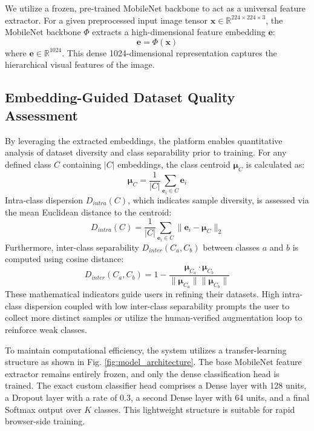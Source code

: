 \documentclass[conference]{IEEEtran}
\begin{document}
We utilize a frozen, pre-trained MobileNet backbone to act as a universal feature extractor. For a given preprocessed input image tensor $\mathbf{x} \in \mathbb{R}^{224 \times 224 \times 3}$, the MobileNet backbone $\Phi$ extracts a high-dimensional feature embedding $\mathbf{e}$:
\begin{equation}
\mathbf{e} = \Phi(\mathbf{x})
\end{equation}
where $\mathbf{e} \in \mathbb{R}^{1024}$. This dense 1024-dimensional representation captures the hierarchical visual features of the image.

\subsection{Embedding-Guided Dataset Quality Assessment}
By leveraging the extracted embeddings, the platform enables quantitative analysis of dataset diversity and class separability prior to training. For any defined class $C$ containing $|C|$ embeddings, the class centroid $\boldsymbol{\mu}_C$ is calculated as:
\begin{equation}
\boldsymbol{\mu}_C = \frac{1}{|C|} \sum_{\mathbf{e}_i \in C} \mathbf{e}_i
\end{equation}
Intra-class dispersion $D_{intra}(C)$, which indicates sample diversity, is assessed via the mean Euclidean distance to the centroid:
\begin{equation}
D_{intra}(C) = \frac{1}{|C|} \sum_{\mathbf{e}_i \in C} \|\mathbf{e}_i - \boldsymbol{\mu}_C\|_2
\end{equation}
Furthermore, inter-class separability $D_{inter}(C_a, C_b)$ between classes $a$ and $b$ is computed using cosine distance:
\begin{equation}
D_{inter}(C_a, C_b) = 1 - \frac{\boldsymbol{\mu}_{C_a} \cdot \boldsymbol{\mu}_{C_b}}{\|\boldsymbol{\mu}_{C_a}\| \|\boldsymbol{\mu}_{C_b}\|}
\end{equation}
These mathematical indicators guide users in refining their datasets. High intra-class dispersion coupled with low inter-class separability prompts the user to collect more distinct samples or utilize the human-verified augmentation loop to reinforce weak classes.

To maintain computational efficiency, the system utilizes a transfer-learning structure as shown in Fig. \ref{fig:model_architecture}. The base MobileNet feature extractor remains entirely frozen, and only the dense classification head is trained. The exact custom classifier head comprises a Dense layer with 128 units, a Dropout layer with a rate of 0.3, a second Dense layer with 64 units, and a final Softmax output over $K$ classes. This lightweight structure is suitable for rapid browser-side training.
\end{document}
